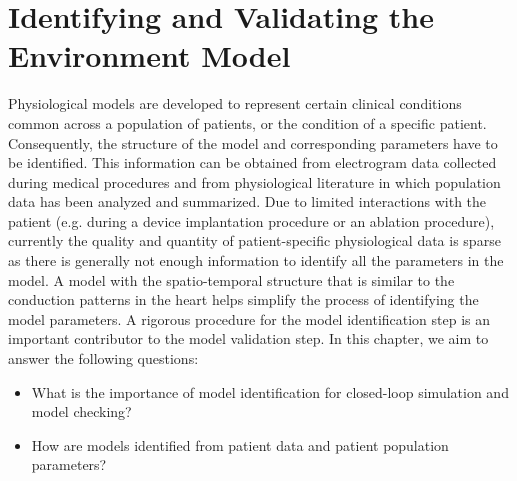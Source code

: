 \chapter{Identifying and Validating the Environment Model }

Physiological models are developed to represent certain clinical conditions common across a population of patients, or the condition of a specific patient. Consequently, the structure of the model and corresponding parameters have to be identified. This information can be obtained from electrogram data collected during medical procedures and from physiological literature in which population data has been analyzed and summarized. Due to limited interactions with the patient (e.g. during a device implantation procedure or an ablation procedure), currently the quality and quantity of patient-specific physiological data is sparse as there is generally not enough information to identify all the parameters in the model.  A model with the spatio-temporal structure that is similar to the conduction patterns in the heart helps simplify the process of identifying the model parameters. A rigorous procedure for the model identification step is an important contributor to the model validation step. In this chapter, we aim to answer the following questions:

\begin{itemize}
	\vspace{-5pt}
	\item What is the importance of model identification for closed-loop simulation and model checking?
	\vspace{-5pt}
    	\item How are models identified from patient data and patient population parameters?
\end{itemize}

